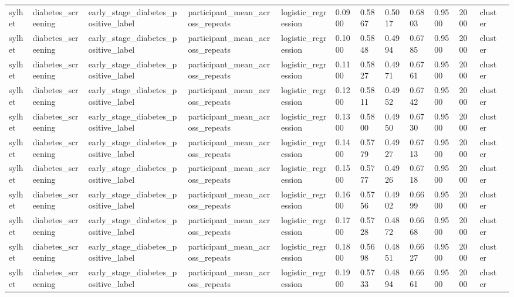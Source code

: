 \begin{tabular}{lllllllllllll}
sylhet & diabetes\_screening & early\_stage\_diabetes\_positive\_label & participant\_mean\_across\_repeats & logistic\_regression & 0.0900 & 0.5867 & 0.5017 & 0.6803 & 0.9500 & 2000 & cluster &  \\
sylhet & diabetes\_screening & early\_stage\_diabetes\_positive\_label & participant\_mean\_across\_repeats & logistic\_regression & 0.1000 & 0.5848 & 0.4994 & 0.6785 & 0.9500 & 2000 & cluster &  \\
sylhet & diabetes\_screening & early\_stage\_diabetes\_positive\_label & participant\_mean\_across\_repeats & logistic\_regression & 0.1100 & 0.5827 & 0.4971 & 0.6761 & 0.9500 & 2000 & cluster &  \\
sylhet & diabetes\_screening & early\_stage\_diabetes\_positive\_label & participant\_mean\_across\_repeats & logistic\_regression & 0.1200 & 0.5811 & 0.4952 & 0.6742 & 0.9500 & 2000 & cluster &  \\
sylhet & diabetes\_screening & early\_stage\_diabetes\_positive\_label & participant\_mean\_across\_repeats & logistic\_regression & 0.1300 & 0.5800 & 0.4950 & 0.6730 & 0.9500 & 2000 & cluster &  \\
sylhet & diabetes\_screening & early\_stage\_diabetes\_positive\_label & participant\_mean\_across\_repeats & logistic\_regression & 0.1400 & 0.5779 & 0.4927 & 0.6713 & 0.9500 & 2000 & cluster &  \\
sylhet & diabetes\_screening & early\_stage\_diabetes\_positive\_label & participant\_mean\_across\_repeats & logistic\_regression & 0.1500 & 0.5777 & 0.4926 & 0.6718 & 0.9500 & 2000 & cluster &  \\
sylhet & diabetes\_screening & early\_stage\_diabetes\_positive\_label & participant\_mean\_across\_repeats & logistic\_regression & 0.1600 & 0.5756 & 0.4902 & 0.6699 & 0.9500 & 2000 & cluster &  \\
sylhet & diabetes\_screening & early\_stage\_diabetes\_positive\_label & participant\_mean\_across\_repeats & logistic\_regression & 0.1700 & 0.5728 & 0.4872 & 0.6668 & 0.9500 & 2000 & cluster &  \\
sylhet & diabetes\_screening & early\_stage\_diabetes\_positive\_label & participant\_mean\_across\_repeats & logistic\_regression & 0.1800 & 0.5698 & 0.4851 & 0.6627 & 0.9500 & 2000 & cluster &  \\
sylhet & diabetes\_screening & early\_stage\_diabetes\_positive\_label & participant\_mean\_across\_repeats & logistic\_regression & 0.1900 & 0.5733 & 0.4894 & 0.6661 & 0.9500 & 2000 & cluster &  \\

\end{tabular}
